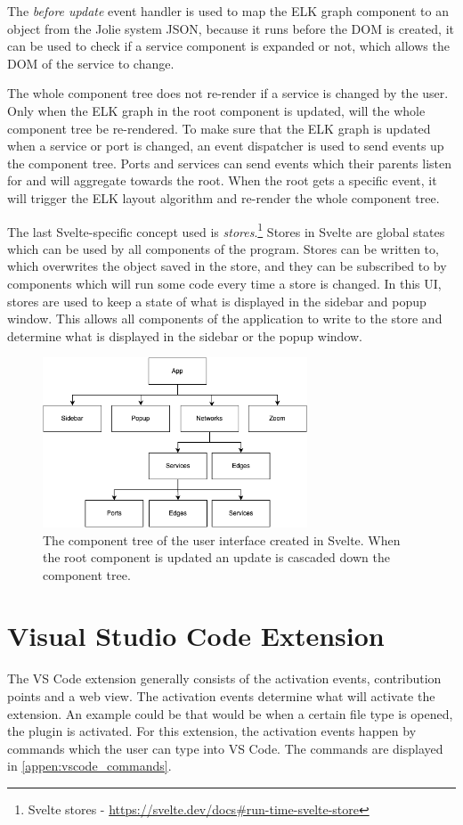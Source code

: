 The \emph{before update} event handler is used to map the ELK graph component to an object from the Jolie system JSON, because it runs before the DOM is created, it can be used to check if a service component is expanded or not, which allows the DOM of the service to change.

The whole component tree does not re-render if a service is changed by the user. Only when the ELK graph in the root component is updated, will the whole component tree be re-rendered. To make sure that the ELK graph is updated when a service or port is changed, an event dispatcher is used to 
send events up the component tree. Ports and services can send events which their parents listen for and will aggregate towards the root. When the root gets a specific event, it will trigger the ELK layout algorithm and re-render the whole component tree.

The last Svelte-specific concept used is \emph{stores}.\footnote{Svelte stores - \url{https://svelte.dev/docs\#run-time-svelte-store}} Stores in Svelte are global states which can be used by all components of the program. Stores can be written to, which overwrites the object saved in the store, and they can be subscribed to by components which will run some code every time a store is changed.
In this UI, stores are used to keep a state of what is displayed in the sidebar and popup window. This allows all components of the application to write to the store and determine what is displayed in the sidebar or the popup window. 

\begin{figure}[t]
    \center
    \includegraphics[width=0.70\textwidth]{figures/component_tree.png}
    \caption{The component tree of the user interface created in Svelte. When the root component is updated an update is cascaded down the component tree.}
    \label{figure:component_tree}
\end{figure}

\section{Visual Studio Code Extension}
The VS Code extension generally consists of the activation events, contribution points and a web view.
The activation events determine what will activate the extension. An example could be that would be when a certain file type is opened, the plugin is activated.
For this extension, the activation events happen by commands which the user can type into VS Code. The commands are displayed in \cref{appen:vscode_commands}.

